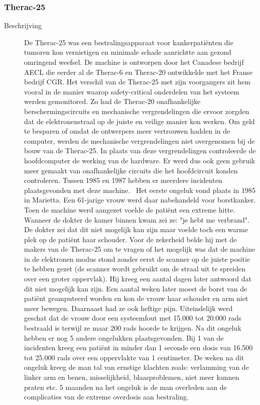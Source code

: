 \documentclass{article}
\begin{document}
\subsubsection{Therac-25}
\begin{description} 
\item[Beschrijving]
De Therac-25 was een bestralingsapparaat voor kankerpatiënten die tumoren kon vernietigen en minimale schade aanrichtte aan gezond omringend weefsel. De machine is ontworpen door het Canadese bedrijf AECL die eerder al de Therac-6 en Therac-20 ontwikkelde met het Franse bedrijf CGR. Het verschil van de Therac-25 met zijn voorgangers zit hem vooral in de manier waarop safety-critical onderdelen van het systeem werden gemonitored. Zo had de Therac-20 onafhankelijke berschermingscircuits en mechanische vergrendelingen die ervoor zorgden dat de elektronenstraal op de juiste en veilige manier kon werken. Om geld te besparen of omdat de ontwerpers meer vertrouwen hadden in de computer, werden de mechanische vergrendelingen niet overgenomen bij de bouw van de Therac-25. In plaats van deze vergrendelingen controleerde de hoofdcomputer de werking van de hardware. Er werd dus ook geen gebruik meer gemaakt van onafhankelijke circuits die het hoofdcircuit konden controleren. 
Tussen 1985 en 1987 hebben er meerdere incidenten plaatsgevonden met deze machine.~\cite{leveson1993investigation}  Het eerste ongeluk vond plaats in 1985 in Marietta. Een 61-jarige vrouw werd daar nabehandeld voor borstkanker. Toen de machine werd aangezet voelde de patiënt een extreme hitte. Wanneer de dokter de kamer binnen kwam zei ze: "je hebt me verbrand". De dokter zei dat dit niet mogelijk kan zijn maar voelde toch een warme plek op de patiënt haar schouder. Voor de zekerheid belde hij met de makers van de Therac-25 om te vragen of het mogelijk was dat de machine in de elektronen modus stond zonder eerst de scanner op de juiste positie te hebben gezet (de scanner wordt gebruikt om de straal uit te spreiden over een groter oppervlak). Hij kreeg een aantal dagen later antwoord dat dit niet mogelijk kan zijn. 
Een aantal weken later moest de borst van de patiënt geamputeerd worden en kon de vrouw haar schouder en arm niet meer bewegen. Daarnaast had ze ook heftige pijn. Uiteindelijk werd geschat dat de vrouw door een systeemfout met 15.000 tot 20.000 rads bestraald is terwijl ze maar 200 rads hoorde te krijgen. Na dit ongeluk hebben er nog 5 andere ongelukken plaatsgevonden. Bij 1 van de incidenten kreeg een patiënt in minder dan 1 seconde een dosis van 16.500 tot 25.000 rads over een oppervlakte van 1 centimeter. De weken na dit ongeluk kreeg de man tal van ernstige klachten zoals: verlamming van de linker arm en benen, misselijkheid, blaasproblemen, niet meer kunnen praten etc. 5 maanden na het ongeluk is de man overleden aan de complicaties van de extreme overdosis aan bestraling.


\end{description}
\end{document}
